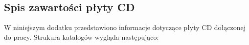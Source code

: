 \begin{appendices}
	\chapter{Spis zawartości płyty CD}
	W niniejszym dodatku przedstawiono informacje dotyczące płyty CD dołączonej do pracy.
 	Strukura katalogów wygląda następująco:
\end{appendices}
